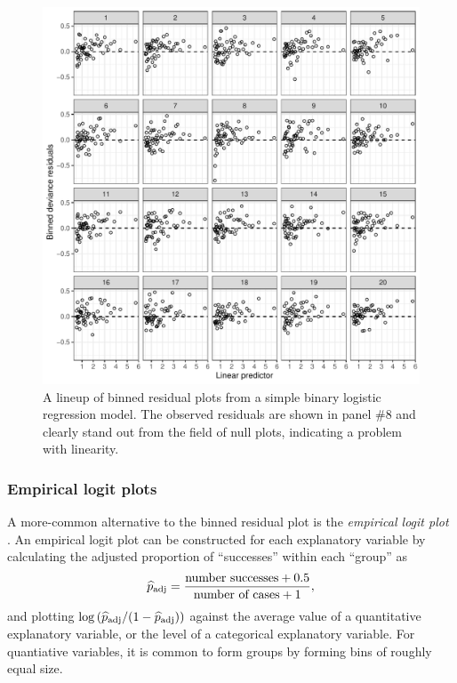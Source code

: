 \documentclass[12pt]{article}
\begin{document}
\begin{figure}
\centering
\includegraphics{figs/wells_binned_residuals.pdf}
\caption{\label{fig:binnedlineup} A lineup of binned residual plots from
a simple binary logistic regression model. The observed residuals are
shown in panel \#8 and clearly stand out from the field of null plots,
indicating a problem with linearity.}
\end{figure}

\hypertarget{empirical-logit-plots}{%
\subsubsection{Empirical logit plots}\label{empirical-logit-plots}}

A more-common alternative to the binned residual plot is the
\emph{empirical logit plot} \citep[c.f.,][]{stat2, ramsey2013}. An
empirical logit plot can be constructed for each explanatory variable by
calculating the adjusted proportion of ``successes'' within each
``group'' as \[
\widehat{p}_{\rm adj} = \frac{\text{number successes} + 0.5}{\text{number of cases} + 1},
\] and plotting
\(\log\left(\widehat{p}_{\rm adj} / (1- \widehat{p}_{\rm adj}) \right)\)
against the average value of a quantitative explanatory variable, or the
level of a categorical explanatory variable. For quantiative variables,
it is common to form groups by forming bins of roughly equal size.
\end{document}
